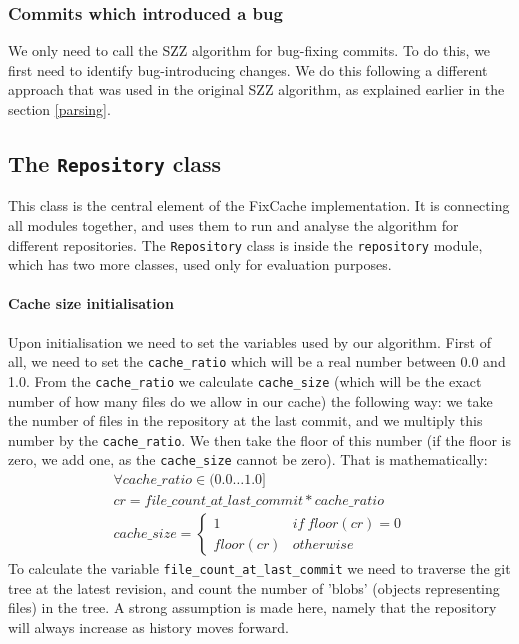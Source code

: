 \documentclass[12pt,twoside,notitlepage]{report}
\newcommand{\fxch}{FixCache }
\begin{document}
\subsubsection*{Commits which introduced a bug}
We only need to call the SZZ algorithm for bug-fixing commits. To do this, we first need to identify bug-introducing changes. We do this following a different approach that was used in the original SZZ algorithm, as explained earlier in the section \ref{parsing}.
\subsection{The \texttt{Repository} class}
This class is the central element of the \fxch implementation. It is connecting all modules together, and uses them to run and analyse the algorithm for different repositories. The \texttt{Repository} class is inside the \texttt{repository} module, which has two more classes, used only for evaluation purposes. 
\paragraph{Cache size initialisation} Upon initialisation we need to set the variables used by our algorithm. First of all, we need to set the \texttt{cache\_ratio} which will be a real number between 0.0 and 1.0. From the \texttt{cache\_ratio} we calculate \texttt{cache\_size} (which will be the exact number of how many files do we allow in our cache) the following way: we take the number of files in the repository at the last commit, and we multiply this number by the \texttt{cache\_ratio}. We then take the floor of this number (if the floor is zero, we add one, as the \texttt{cache\_size} cannot be zero). That is mathematically:
\begin{align*}
	\forall cache\_ratio \in (0.0\dots 1.0]\\
	cr = file\_count\_at\_last\_commit*cache\_ratio\\
	cache\_size = \begin{cases}
						1 & if\ floor(cr) = 0\\
						floor(cr) & otherwise
					\end{cases}
\end{align*}
To calculate the variable \texttt{file\_count\_at\_last\_commit} we need to traverse the git tree at the latest revision, and count the number of 'blobs' (objects representing files) in the tree. A strong assumption is made here, namely that the repository will always increase as history moves forward. 
\end{document}
